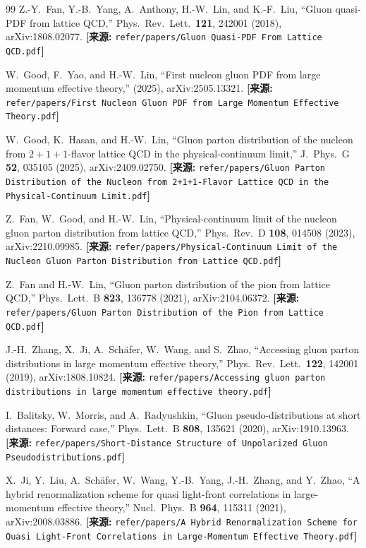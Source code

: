 \documentclass[12pt,a4paper]{ctexart}
\theoremstyle{definition}
\begin{document}
\begin{thebibliography}{99}
Z.-Y.~Fan, Y.-B.~Yang, A.~Anthony, H.-W.~Lin, and K.-F.~Liu,
``Gluon quasi-PDF from lattice QCD,''
Phys.\ Rev.\ Lett.\ \textbf{121}, 242001 (2018), arXiv:1808.02077.
\quad\textbf{[来源:} \texttt{refer/papers/Gluon Quasi-PDF From Lattice QCD.pdf}\textbf{]}

W.~Good, F.~Yao, and H.-W.~Lin,
``First nucleon gluon PDF from large momentum effective theory,''
(2025), arXiv:2505.13321.
\quad\textbf{[来源:} \texttt{refer/papers/First Nucleon Gluon PDF from Large Momentum Effective Theory.pdf}\textbf{]}

W.~Good, K.~Hasan, and H.-W.~Lin,
``Gluon parton distribution of the nucleon from $2+1+1$-flavor lattice QCD in the physical-continuum limit,''
J.\ Phys.\ G \textbf{52}, 035105 (2025), arXiv:2409.02750.
\quad\textbf{[来源:} \texttt{refer/papers/Gluon Parton Distribution of the Nucleon from 2+1+1-Flavor Lattice QCD in the Physical-Continuum Limit.pdf}\textbf{]}

Z.~Fan, W.~Good, and H.-W.~Lin,
``Physical-continuum limit of the nucleon gluon parton distribution from lattice QCD,''
Phys.\ Rev.\ D \textbf{108}, 014508 (2023), arXiv:2210.09985.
\quad\textbf{[来源:} \texttt{refer/papers/Physical-Continuum Limit of the Nucleon Gluon Parton Distribution from Lattice QCD.pdf}\textbf{]}

Z.~Fan and H.-W.~Lin,
``Gluon parton distribution of the pion from lattice QCD,''
Phys.\ Lett.\ B \textbf{823}, 136778 (2021), arXiv:2104.06372.
\quad\textbf{[来源:} \texttt{refer/papers/Gluon Parton Distribution of the Pion from Lattice QCD.pdf}\textbf{]}

J.-H.~Zhang, X.~Ji, A.~Sch\"afer, W.~Wang, and S.~Zhao,
``Accessing gluon parton distributions in large momentum effective theory,''
Phys.\ Rev.\ Lett.\ \textbf{122}, 142001 (2019), arXiv:1808.10824.
\quad\textbf{[来源:} \texttt{refer/papers/Accessing gluon parton distributions in large momentum effective theory.pdf}\textbf{]}

I.~Balitsky, W.~Morris, and A.~Radyushkin,
``Gluon pseudo-distributions at short distances: Forward case,''
Phys.\ Lett.\ B \textbf{808}, 135621 (2020), arXiv:1910.13963.
\quad\textbf{[来源:} \texttt{refer/papers/Short-Distance Structure of Unpolarized Gluon Pseudodistributions.pdf}\textbf{]}

X.~Ji, Y.~Liu, A.~Sch\"afer, W.~Wang, Y.-B.~Yang, J.-H.~Zhang, and Y.~Zhao,
``A hybrid renormalization scheme for quasi light-front correlations in large-momentum effective theory,''
Nucl.\ Phys.\ B \textbf{964}, 115311 (2021), arXiv:2008.03886.
\quad\textbf{[来源:} \texttt{refer/papers/A Hybrid Renormalization Scheme for Quasi Light-Front Correlations in Large-Momentum Effective Theory.pdf}\textbf{]}


\end{thebibliography}
\end{document}
